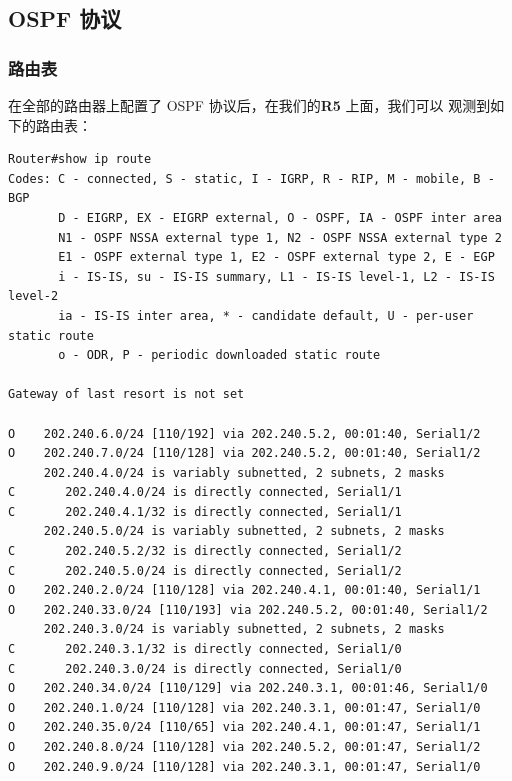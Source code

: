 \documentclass[black,normal,cn]{elegantnote}
\begin{document}
\subsection{OSPF 协议}
\subsubsection{路由表}
在全部的路由器上配置了 OSPF 协议后，在我们的\textbf{R5} 上面，我们可以
观测到如下的路由表：
\begin{lstlisting}
Router#show ip route
Codes: C - connected, S - static, I - IGRP, R - RIP, M - mobile, B - BGP
       D - EIGRP, EX - EIGRP external, O - OSPF, IA - OSPF inter area
       N1 - OSPF NSSA external type 1, N2 - OSPF NSSA external type 2
       E1 - OSPF external type 1, E2 - OSPF external type 2, E - EGP
       i - IS-IS, su - IS-IS summary, L1 - IS-IS level-1, L2 - IS-IS level-2
       ia - IS-IS inter area, * - candidate default, U - per-user static route
       o - ODR, P - periodic downloaded static route

Gateway of last resort is not set

O    202.240.6.0/24 [110/192] via 202.240.5.2, 00:01:40, Serial1/2
O    202.240.7.0/24 [110/128] via 202.240.5.2, 00:01:40, Serial1/2
     202.240.4.0/24 is variably subnetted, 2 subnets, 2 masks
C       202.240.4.0/24 is directly connected, Serial1/1
C       202.240.4.1/32 is directly connected, Serial1/1
     202.240.5.0/24 is variably subnetted, 2 subnets, 2 masks
C       202.240.5.2/32 is directly connected, Serial1/2
C       202.240.5.0/24 is directly connected, Serial1/2
O    202.240.2.0/24 [110/128] via 202.240.4.1, 00:01:40, Serial1/1
O    202.240.33.0/24 [110/193] via 202.240.5.2, 00:01:40, Serial1/2
     202.240.3.0/24 is variably subnetted, 2 subnets, 2 masks
C       202.240.3.1/32 is directly connected, Serial1/0
C       202.240.3.0/24 is directly connected, Serial1/0
O    202.240.34.0/24 [110/129] via 202.240.3.1, 00:01:46, Serial1/0
O    202.240.1.0/24 [110/128] via 202.240.3.1, 00:01:47, Serial1/0
O    202.240.35.0/24 [110/65] via 202.240.4.1, 00:01:47, Serial1/1
O    202.240.8.0/24 [110/128] via 202.240.5.2, 00:01:47, Serial1/2
O    202.240.9.0/24 [110/128] via 202.240.3.1, 00:01:47, Serial1/0
\end{lstlisting}
\end{document}
